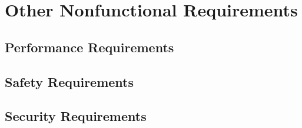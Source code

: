 
\chapter{Other Nonfunctional Requirements} \label{chp:other-nonfunctional-requirements}

\section{Performance Requirements}
	\begin{comment}
		$<$If there are performance requirements for the product under various 
		circumstances, state them here and explain their rationale, to help the 
		developers understand the intent and make suitable design choices. Specify the 
		timing relationships for real time systems. Make such requirements as specific 
		as possible. You may need to state performance requirements for individual 
		functional requirements or features.$>$
	\end{comment}
	
\section{Safety Requirements}
	\begin{comment}
		$<$Specify those requirements that are concerned with possible loss, damage, or 
		harm that could result from the use of the product. Define any safeguards or 
		actions that must be taken, as well as actions that must be prevented. Refer to 
		any external policies or regulations that state safety issues that affect the 
		product’s design or use. Define any safety certifications that must be 
		satisfied.$>$
	\end{comment}

\section{Security Requirements}
	\begin{comment}
		$<$Specify any requirements regarding security or privacy issues surrounding use 
		of the product or protection of the data used or created by the product. Define 
		any user identity authentication requirements. Refer to any external policies or 
		regulations containing security issues that affect the product. Define any 
		security or privacy certifications that must be satisfied.$>$
	\end{comment}

